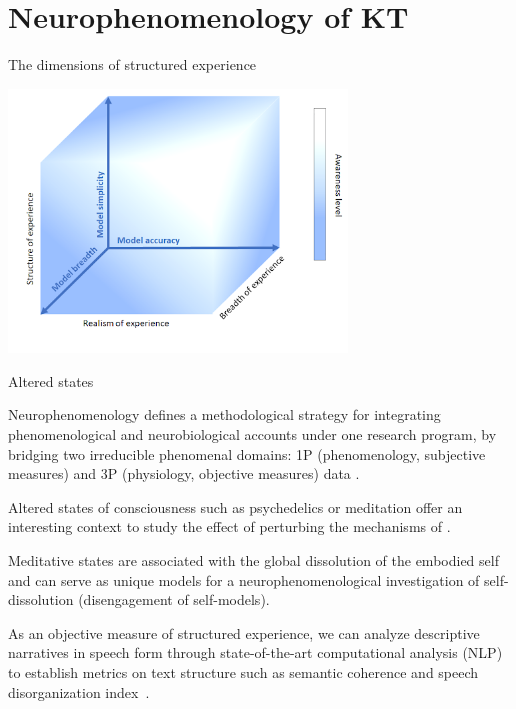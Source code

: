 \section{Neurophenomenology of KT}


\begin{frame}[label=ladila]{The dimensions of structured experience}
  
 \begin{center}%
  \includegraphics[height=7cm]{img/3dKT.png}
  \end{center}
  
 
\end{frame}

\begin{frame}[label=ladila]{Altered states}
  
 Neurophenomenology defines a methodological strategy for integrating phenomenological and neurobiological accounts under one research program, by bridging  two irreducible phenomenal domains: 1P  (phenomenology, subjective measures) and 3P (physiology, objective measures) data \citep{Varela:1996aa}. \vfill
 
 Altered states of consciousness such as psychedelics or meditation offer an interesting context to study the effect of perturbing the mechanisms of \SEP.\vfill
 
Meditative states are associated with the global dissolution of the embodied self  \citep{Millire2018} and can  serve as unique models for a neurophenomenological investigation of self-dissolution (disengagement of self-models).\vfill
 
 As an  objective measure of structured experience, we can analyze descriptive narratives in speech form through state-of-the-art computational analysis (NLP) to establish  metrics on text structure such as semantic coherence and speech disorganization index~\citep{Sanz:2021, Tagliazucchi:2022, Mota:2017}.
 
 
\end{frame}


